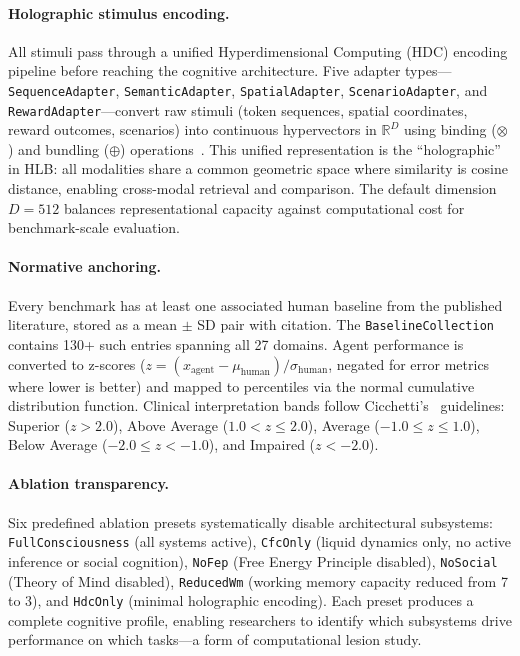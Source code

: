 \documentclass[11pt,letterpaper]{article}
\newcommand{\bind}{\otimes}
\newcommand{\bundle}{\oplus}
\newcommand{\hlb}{\textsc{HLB}}
\begin{document}
\paragraph{Holographic stimulus encoding.} All stimuli pass through a unified Hyperdimensional Computing (HDC) encoding pipeline before reaching the cognitive architecture. Five adapter types---\texttt{SequenceAdapter}, \texttt{SemanticAdapter}, \texttt{SpatialAdapter}, \texttt{ScenarioAdapter}, and \texttt{RewardAdapter}---convert raw stimuli (token sequences, spatial coordinates, reward outcomes, scenarios) into continuous hypervectors in $\mathbb{R}^D$ using binding ($\bind$) and bundling ($\bundle$) operations~\citep{kleyko2023survey}. This unified representation is the ``holographic'' in \hlb{}: all modalities share a common geometric space where similarity is cosine distance, enabling cross-modal retrieval and comparison. The default dimension $D = 512$ balances representational capacity against computational cost for benchmark-scale evaluation.

\paragraph{Normative anchoring.} Every benchmark has at least one associated human baseline from the published literature, stored as a mean $\pm$ SD pair with citation. The \texttt{BaselineCollection} contains 130+ such entries spanning all 27 domains. Agent performance is converted to z-scores ($z = (x_{\text{agent}} - \mu_{\text{human}}) / \sigma_{\text{human}}$, negated for error metrics where lower is better) and mapped to percentiles via the normal cumulative distribution function. Clinical interpretation bands follow Cicchetti's~\citep{cicchetti1994guidelines} guidelines: Superior ($z > 2.0$), Above Average ($1.0 < z \leq 2.0$), Average ($-1.0 \leq z \leq 1.0$), Below Average ($-2.0 \leq z < -1.0$), and Impaired ($z < -2.0$).

\paragraph{Ablation transparency.} Six predefined ablation presets systematically disable architectural subsystems: \texttt{FullConsciousness} (all systems active), \texttt{CfcOnly} (liquid dynamics only, no active inference or social cognition), \texttt{NoFep} (Free Energy Principle disabled), \texttt{NoSocial} (Theory of Mind disabled), \texttt{ReducedWm} (working memory capacity reduced from 7 to 3), and \texttt{HdcOnly} (minimal holographic encoding). Each preset produces a complete cognitive profile, enabling researchers to identify which subsystems drive performance on which tasks---a form of computational lesion study.
\end{document}
